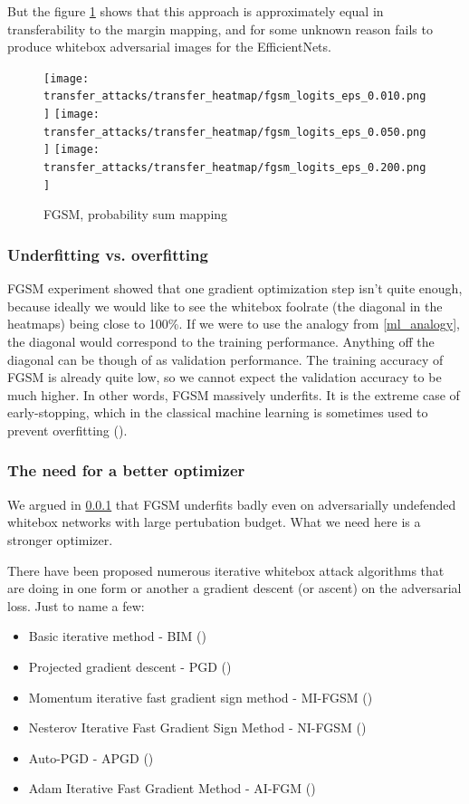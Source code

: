 But the figure \ref{fig:fgsm_prob_sum} shows that this approach is approximately equal in transferability to the margin mapping, and for some unknown reason fails to produce whitebox adversarial images for the EfficientNets.

\begin{figure}[!htb]
  \texttt{[image: transfer\_attacks/transfer\_heatmap/fgsm\_logits\_eps\_0.010.png]}
\endminipage\hfill
{}
  \texttt{[image: transfer\_attacks/transfer\_heatmap/fgsm\_logits\_eps\_0.050.png]}
\endminipage\hfill
{}%
  \texttt{[image: transfer\_attacks/transfer\_heatmap/fgsm\_logits\_eps\_0.200.png]}
\endminipage
\caption{FGSM, probability sum mapping}
\label{fig:fgsm_prob_sum}
\end{figure}


\subsubsection{Underfitting vs. overfitting}
\label{fgsm_underfits}
FGSM experiment showed that one gradient optimization step isn't quite enough, because ideally we would like to see the whitebox foolrate (the diagonal in the heatmaps) being close to 100\%. If we were to use the analogy from \ref{ml_analogy}, the diagonal would correspond to the training performance. Anything off the diagonal can be though of as validation performance. The training accuracy of FGSM is already quite low, so we cannot expect the validation accuracy to be much higher. In other words, FGSM massively underfits. It is the extreme case of early-stopping, which in the classical machine learning is sometimes used to prevent overfitting (\cite{Caruana2000OverfittingIN}).

\subsubsection{The need for a better optimizer}
We argued in \ref{fgsm_underfits} that FGSM underfits badly even on adversarially undefended whitebox networks with large pertubation budget. What we need here is a stronger optimizer.

There have been proposed numerous iterative whitebox attack algorithms that are doing in one form or another a gradient descent (or ascent) on the adversarial loss. Just to name a few:

\begin{itemize}
    \item Basic iterative method - BIM (\cite{Kurakin2017AdversarialEI})
    \item Projected gradient descent - PGD (\cite{madry2019deep})
    \item Momentum iterative fast gradient sign method - MI-FGSM (\cite{Dong2018BoostingAA})
    \item Nesterov Iterative Fast Gradient Sign Method - NI-FGSM (\cite{lin2020nesterov})
    \item Auto-PGD - APGD (\cite{croce2020reliable})
    \item Adam Iterative Fast Gradient Method - AI-FGM (\cite{Yin2021BoostingAA})
\end{itemize}

